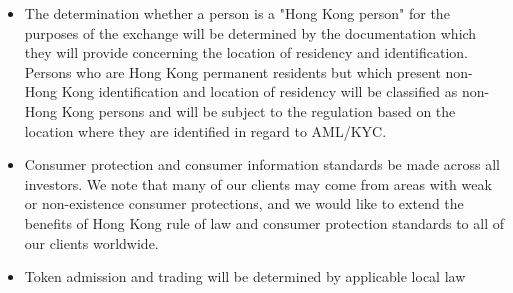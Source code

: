 \begin{itemize}
  \item The determination whether a person is a "Hong
    Kong person" for the purposes of the exchange will be determined
    by the documentation which they will provide concerning the location
    of residency and identification.  Persons who are Hong Kong
    permanent residents but which present non-Hong Kong identification and
    location of residency will be classified as non-Hong Kong persons
    and will be subject to the regulation based on the location where
    they are identified in regard to AML/KYC.
  \item Consumer protection and consumer information standards be made
    across all investors.  We note that many of our clients may come
    from areas with weak or non-existence consumer protections, and we
    would like to extend the benefits of Hong Kong rule of law and
    consumer protection standards to all of our clients worldwide.
  \item Token admission and trading will be determined by applicable
    local law
\end{itemize}

